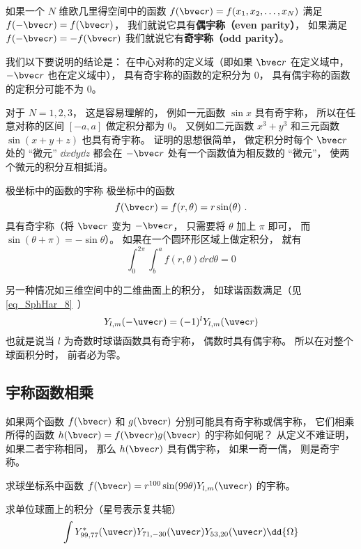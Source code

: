 

如果一个 $N$ 维欧几里得空间中的函数 $f(\bvec r) = f(x_1, x_2, \dots, x_N)$ 满足  $f(-\bvec r) = f(\bvec r)$， 我们就说它具有\textbf{偶宇称（even parity）}， 如果满足  $f(-\bvec r) = -f(\bvec r)$ 我们就说它有\textbf{奇宇称（odd parity）}。

我们以下要说明的结论是： 在中心对称的定义域（即如果 $\bvec r$ 在定义域中， $-\bvec r$ 也在定义域中）， 具有奇宇称的函数的定积分为 0， 具有偶宇称的函数的定积分可能不为 0。

对于 $N = 1, 2, 3$， 这是容易理解的， 例如一元函数 $\sin x$ 具有奇宇称， 所以在任意对称的区间 $[-a, a]$ 做定积分都为 0。 又例如二元函数 $x^3 + y^3$ 和三元函数 $\sin(x + y + z)$ 也具有奇宇称。 证明的思想很简单， 做定积分时每个 $\bvec r$ 处的 “微元” $\dd{x}\dd{y}\dd{z}$ 都会在 $-\bvec r$ 处有一个函数值为相反数的 “微元”， 使两个微元的积分互相抵消。

\begin{example}{极坐标中的函数的宇称}
极坐标中的函数
\begin{equation}\label{eq_IntPry_1}
f(\bvec r) = f(r, \theta) = r\sin(\theta)~.
\end{equation}
具有奇宇称（将 $\bvec r$ 变为 $-\bvec r$， 只需要将 $\theta$ 加上 $\pi$ 即可， 而 $\sin(\theta + \pi) = -\sin\theta$）。 如果在一个圆环形区域上做定积分， 就有
\begin{equation}
\int_0^{2\pi} \int_b^a f(r, \theta) \dd{r} \dd{\theta} = 0
\end{equation}
\end{example}

另一种情况如三维空间中的二维曲面上的积分， 如球谐函数满足（见\autoref{eq_SphHar_8}~）
\begin{equation}\label{eq_IntPry_3}
Y_{l,m}(-\uvec r) = (-1)^l Y_{l,m}(\uvec r)
\end{equation}
也就是说当 $l$ 为奇数时球谐函数具有奇宇称， 偶数时具有偶宇称。 所以在对整个球面积分时， 前者必为零。

\subsection{宇称函数相乘}
如果两个函数 $f(\bvec r)$ 和 $g(\bvec r)$ 分别可能具有奇宇称或偶宇称， 它们相乘所得的函数 $h(\bvec r) = f(\bvec r) g(\bvec r)$ 的宇称如何呢？ 从定义不难证明， 如果二者宇称相同， 那么 $h(\bvec r)$ 具有偶宇称， 如果一奇一偶， 则是奇宇称。

\begin{exercise}{}
求球坐标系中函数 $f(\bvec r) = r^{100}\sin(99\theta) Y_{l, m}(\uvec r)$ 的宇称。
\end{exercise}

\begin{exercise}{}
求单位球面上的积分（星号表示复共轭）
\begin{equation}
\int Y_{99, 77}^*(\uvec r) Y_{71, -30}(\uvec r) Y_{53, 20}(\uvec r) \dd{\Omega}
\end{equation}
\end{exercise}
